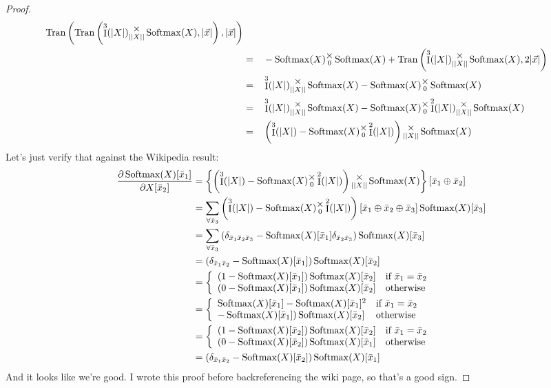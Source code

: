 \documentclass[12pt]{book}
\theoremstyle{plain}
\theoremstyle{definition}
\theoremstyle{ppart}
\theoremstyle{case}
\theoremstyle{solution}
\DeclareMathOperator{\Ident}{I}
\DeclareMathOperator{\Tran}{Tran}
\DeclareMathOperator{\Softmax}{Softmax}
\newcommand{\mmult}[1]{\text{\raisebox{1ex}{$\underset{#1}{\times}$}}}
\begin{document}
\begin{landscape}
\begin{proof}
\begin{alignat}{3}
	\Tran\left(
		\Tran\left(
			\Ident^3(|X|) \mmult{||X||} \Softmax(X)
		,|\vec{x}|
		\right)
	,|\vec{x}|
	\right) \\
	&=&&
	-\Softmax(X) \mmult{0} \Softmax(X)
	+
	\Tran\left(
		\Ident^3(|X|) \mmult{||X||} \Softmax(X)
		,2|\vec{x}|
	\right) \\
	&=&&
	\Ident^3(|X|) \mmult{||X||} \Softmax(X)
  -\Softmax(X) \mmult{0} \Softmax(X) \\
	&=&&
	\Ident^3(|X|) \mmult{||X||} \Softmax(X)
	-\Softmax(X) \mmult{0} \Ident^2(|X|) \mmult{||X||} \Softmax(X) \\
	&=&&
	\left(\Ident^3(|X|) - \Softmax(X) \mmult{0} \Ident^2(|X|) \right)
	\mmult{||X||} \Softmax(X)
\end{alignat}
Let's just verify that against the Wikipedia \cite{wiki:softmax} result:
\begin{align*}
	\frac{\partial \Softmax(X)[\bar{x}_1]}{\partial X[\bar{x}_2]}
	&=
	\left\{
		\left(\Ident^3(|X|) - \Softmax(X) \mmult{0} \Ident^2(|X|) \right)
		\mmult{||X||} \Softmax(X)
	\right\}
	[\bar{x}_1 \oplus \bar{x}_2] \\
	&=
	\sum_{\forall \bar{x}_3}
	\left(\Ident^3(|X|) - \Softmax(X) \mmult{0} \Ident^2(|X|) \right)
	[\bar{x}_1 \oplus \bar{x}_2 \oplus \bar{x}_3]
	\Softmax(X)[\bar{x}_3] \\
	&=
	\sum_{\forall \bar{x}_3}
	\left(
		\delta_{\bar{x}_1 \bar{x}_2 \bar{x}_3}
		- \Softmax(X)[\bar{x}_1] \delta_{\bar{x}_2 \bar{x}_3}
	\right)
	\Softmax(X)[\bar{x}_3] \\
	&=
	(\delta_{\bar{x}_1 \bar{x}_2} - \Softmax(X)[\bar{x}_1])
	\Softmax(X)[\bar{x}_2] \\
	&= \left\{
  \begin{array}{ll}
    (1-\Softmax(X)[\bar{x}_1])\Softmax(X)[\bar{x}_2]
			& \mbox{if } \bar{x}_1 = \bar{x}_2 \\
    (0-\Softmax(X)[\bar{x}_1])\Softmax(X)[\bar{x}_2]
			& \mbox{otherwise}
  \end{array}
	\right. \\
	&= \left\{
  \begin{array}{ll}
    \Softmax(X)[\bar{x}_1]-\Softmax(X)[\bar{x}_1]^2
			& \mbox{if } \bar{x}_1 = \bar{x}_2 \\
    -\Softmax(X)[\bar{x}_1])\Softmax(X)[\bar{x}_2]
			& \mbox{otherwise}
  \end{array}
	\right. \\
	&= \left\{
  \begin{array}{ll}
    (1-\Softmax(X)[\bar{x}_2])\Softmax(X)[\bar{x}_2]
			& \mbox{if } \bar{x}_1 = \bar{x}_2 \\
    (0-\Softmax(X)[\bar{x}_2])\Softmax(X)[\bar{x}_1]
			& \mbox{otherwise}
  \end{array}
	\right. \\
	&= (\delta_{\bar{x}_1 \bar{x}_2} - \Softmax(X)[\bar{x}_2])
	\Softmax(X)[\bar{x}_1]
\end{align*}
And it looks like we're good. I wrote this proof before backreferencing the wiki
page, so that's a good sign.
\end{proof}
\end{landscape}
\end{document}
